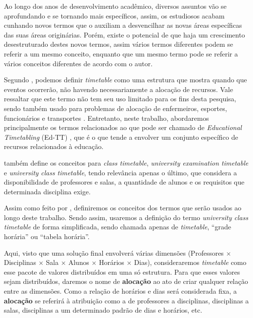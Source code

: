 Ao longo dos anos de desenvolvimento acadêmico, diversos assuntos vão se aprofundando e se tornando mais específicos, assim, os estudiosos acabam cunhando novos termos que o auxiliam a desvencilhar as novas áreas específicas das suas áreas originárias. Porém, existe o potencial de que haja um crescimento desestruturado destes novos termos, assim vários termos diferentes podem se referir a um mesmo conceito, enquanto que um mesmo termo pode se referir a vários conceitos diferentes de acordo com o autor.

Segundo , podemos definir \textit{timetable} como uma estrutura que mostra quando que eventos ocorrerão, não havendo necessariamente a alocação de recursos. Vale ressaltar que este termo não tem seu uso limitado para os fins desta pesquisa, sendo também usado para problemas de alocação de enfermeiros, esportes, funcionários e transportes \cite{arratia-martinez_university_2021}. Entretanto, neste trabalho, abordaremos principalmente os termos relacionados ao que pode ser chamado de \textit{Educational Timetabling} (Ed-TT) \cite{Alencar2019}, que é o que tende a envolver um conjunto específico de recursos relacionados à educação.

 também define os conceitos para \textit{class timetable}, \textit{university examination timetable} e \textit{university class timetable}, tendo relevância apenas o último, que considera a disponibilidade de professores e salas, a quantidade de alunos e os requisitos que determinada disciplina exige.

Assim como feito por , definiremos os conceitos dos termos que serão usados ao longo deste trabalho. Sendo assim, usaremos a definição do termo \textit{university class timetable} de forma simplificada, sendo chamada apenas de \textit{timetable}, ``grade horária'' ou ``tabela horária''.


Aqui, visto que uma solução final envolverá várias dimensões (Professores $\times$ Disciplinas $\times$ Sala $\times$ Alunos $\times$ Horários $\times$ Dias), consideraremos \textit{timetable} como esse pacote de valores distribuídos em uma só estrutura. Para que esses valores sejam distribuídos, daremos o nome de \textbf{alocação} ao ato de criar qualquer relação entre as dimensões. Como a relação de horários e dias será considerada fixa, a \textbf{alocação} se referirá à atribuição como a de professores a disciplinas, disciplinas a salas, disciplinas a um determinado padrão de dias e horários, etc.


